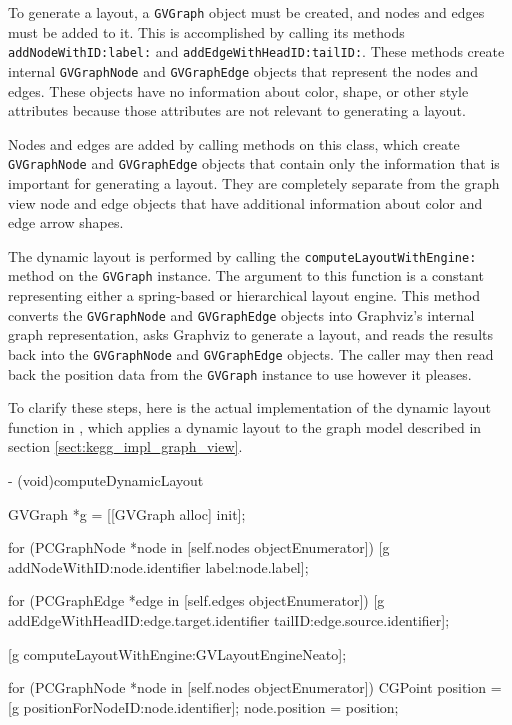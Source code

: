 To generate a layout, a \texttt{GVGraph} object must be created, and nodes and
edges must be added to it. This is accomplished by calling its methods
\texttt{addNodeWithID:label:} and \texttt{addEdgeWithHeadID:tailID:}. These
methods create internal \texttt{GVGraphNode} and \texttt{GVGraphEdge} objects
that represent the nodes and edges. These objects have no information about
color, shape, or other style attributes because those attributes are not
relevant to generating a layout.

Nodes and edges are added by calling methods on this class, which create
\texttt{GVGraphNode} and \texttt{GVGraphEdge} objects that contain only the
information that is important for generating a layout. They are completely
separate from the graph view node and edge objects that have additional
information about color and edge arrow shapes.

The dynamic layout is performed by calling the \texttt{computeLayoutWithEngine:}
method on the \texttt{GVGraph} instance. The argument to this function is a
constant representing either a spring-based or hierarchical layout engine. This
method converts the \texttt{GVGraphNode} and \texttt{GVGraphEdge} objects into
Graphviz's internal graph representation, asks Graphviz to generate a layout,
and reads the results back into the \texttt{GVGraphNode} and
\texttt{GVGraphEdge} objects. The caller may then read back the position data
from the \texttt{GVGraph} instance to use however it pleases.

To clarify these steps, here is the actual implementation of the dynamic layout
function in \keggapp, which applies a dynamic layout to the graph model
described in section \ref{sect:kegg_impl_graph_view}.

\begin{objc}
- (void)computeDynamicLayout
{
    GVGraph *g = [[GVGraph alloc] init];
    
    for (PCGraphNode *node in [self.nodes objectEnumerator]) {
        [g addNodeWithID:node.identifier label:node.label];
    }
    
    for (PCGraphEdge *edge in [self.edges objectEnumerator]) {
        [g addEdgeWithHeadID:edge.target.identifier tailID:edge.source.identifier];
    }
    
    [g computeLayoutWithEngine:GVLayoutEngineNeato];
    
    for (PCGraphNode *node in [self.nodes objectEnumerator]) {
        CGPoint position = [g positionForNodeID:node.identifier];
        node.position = position;
    }
}
\end{objc}
